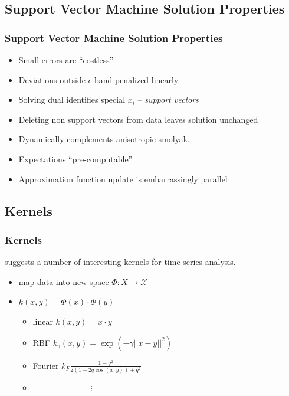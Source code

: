 \documentclass[tikz]{beamer}
\begin{document}
\subsection{Support Vector Machine Solution Properties}

\begin{frame}
  \frametitle{Support Vector Machine Solution Properties}

  \begin{itemize}
  \item Small errors  are ``costless''
    \item Deviations outside $\epsilon$ band penalized linearly
    \item Solving dual identifies special $x_i$ -- {\em support vectors}
    \item Deleting non support vectors from data  leaves solution unchanged
    \item Dynamically complements anisotropic smolyak.\cite{Judd2014}
    \item Expectations ``pre-computable''
    \item Approximation function update is embarrassingly parallel
  \end{itemize}

\end{frame}


\subsection{Kernels}
\begin{frame}
  \frametitle{Kernels}

\label{sec:kernels}
\cite{Ruping01svmkernels} suggests a number of interesting kernels for 
time series analysis. 
\begin{itemize}
\item map data into new space $\Phi : X \rightarrow \mathcal{X}$
\item $k(x,y)= \Phi(x) \cdot \Phi(y)$
\begin{itemize}
\item linear $k(x,y)= x \cdot y$
\item RBF $k_\gamma(x,y)=\exp(-\gamma||x-y||^2)$
\item Fourier $k_F\frac{1-q^2}{2(1-2q \cos(x,y))+q^2}$
\item \ \ \ \ \ \ \ \ \ \ \ \ \ \ $\vdots$
\end{itemize}
\end{itemize}

\end{frame}
\end{document}
